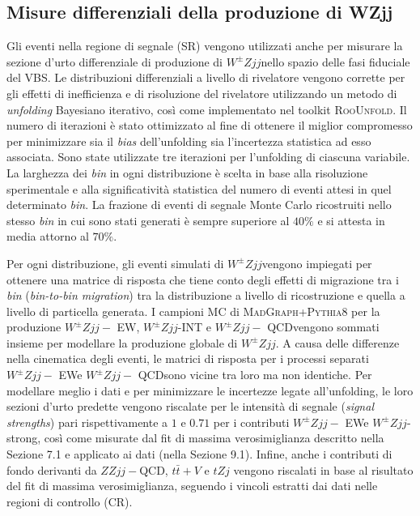 \documentclass[11pt]{article}
\newcommand{\wzjjew}{$W^\pm Z jj-$ EW}
\newcommand{\wzjjqcd}{$W^\pm Z jj-$ QCD}
\newcommand{\wzjj}{$W^\pm Z jj$}
\begin{document}
\subsection{Misure differenziali della produzione di WZjj}
Gli eventi nella regione di segnale (SR) vengono utilizzati anche per misurare la sezione d'urto differenziale di produzione di \wzjj nello spazio delle fasi fiduciale del VBS. Le distribuzioni differenziali a livello di rivelatore vengono corrette per gli effetti di inefficienza e di risoluzione del rivelatore utilizzando un metodo di \textit{unfolding} Bayesiano iterativo, così come implementato nel toolkit \textsc{RooUnfold}. Il numero di iterazioni è stato ottimizzato al fine di ottenere il miglior compromesso per minimizzare sia il \textit{bias} dell'unfolding sia l'incertezza statistica ad esso associata. Sono state utilizzate tre iterazioni per l'unfolding di ciascuna variabile. La larghezza dei \textit{bin} in ogni distribuzione è scelta in base alla risoluzione sperimentale e alla significatività statistica del numero di eventi attesi in quel determinato \textit{bin}. La frazione di eventi di segnale Monte Carlo ricostruiti nello stesso \textit{bin} in cui sono stati generati è sempre superiore al $40\%$ e si attesta in media attorno al $70\%$.

Per ogni distribuzione, gli eventi simulati di \wzjj vengono impiegati per ottenere una matrice di risposta che tiene conto degli effetti di migrazione tra i \textit{bin} (\textit{bin-to-bin migration}) tra la distribuzione a livello di ricostruzione e quella a livello di particella generata. I campioni MC di \textsc{MadGraph}+\textsc{Pythia8} per la produzione \wzjjew, \wzjj-INT e \wzjjqcd vengono sommati insieme per modellare la produzione globale di \wzjj. A causa delle differenze nella cinematica degli eventi, le matrici di risposta per i processi separati \wzjjew e \wzjjqcd sono vicine tra loro ma non identiche. Per modellare meglio i dati e per minimizzare le incertezze legate all'unfolding, le loro sezioni d'urto predette vengono riscalate per le intensità di segnale (\textit{signal strengths}) pari rispettivamente a $1$ e $0.71$ per i contributi \wzjjew e \wzjj-strong, così come misurate dal fit di massima verosimiglianza descritto nella Sezione 7.1 e applicato ai dati (nella Sezione 9.1). Infine, anche i contributi di fondo derivanti da $ZZjj-$QCD, $t\bar{t}+V$ e $tZj$ vengono riscalati in base al risultato del fit di massima verosimiglianza, seguendo i vincoli estratti dai dati nelle regioni di controllo (CR).
\end{document}
